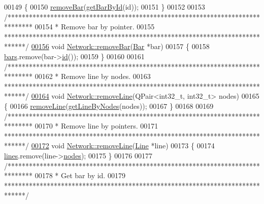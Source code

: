 \begin{DoxyCode}
00149 \{
00150   \hyperlink{group___models_ga997ce4f03d316b9f138f2e64e6ca400c}{removeBar}(\hyperlink{group___models_ga04d524ce0fa0dd0d06deda92b1597af0}{getBarById}(\textcolor{keywordtype}{id}));
00151 \}
00152 
00153 \textcolor{comment}{/*******************************************************************************}
00154 \textcolor{comment}{ * Remove bar by pointer.}
00155 \textcolor{comment}{ ******************************************************************************/}
\hypertarget{network_8cpp_source_l00156}{}\hyperlink{group___models_ga7dea7690987c58fa61ffaa0326b68b68}{00156} \textcolor{keywordtype}{void} \hyperlink{group___models_ga997ce4f03d316b9f138f2e64e6ca400c}{Network::removeBar}(\hyperlink{class_bar}{Bar} *bar)
00157 \{
00158   \hyperlink{class_network_ae37a8418e42adf765b143cdc9d992b6c}{bars}.remove(bar->\hyperlink{group___models_gacf0fb781a73856bb7beb823304465e13}{id}());
00159 \}
00160 
00161 \textcolor{comment}{/*******************************************************************************}
00162 \textcolor{comment}{ * Remove line by nodes.}
00163 \textcolor{comment}{ ******************************************************************************/}
\hypertarget{network_8cpp_source_l00164}{}\hyperlink{group___models_ga1eef3317224a7a06348fce07e581a9ad}{00164} \textcolor{keywordtype}{void} \hyperlink{group___models_ga1eef3317224a7a06348fce07e581a9ad}{Network::removeLine}(QPair<int32\_t, int32\_t> nodes)
00165 \{
00166   \hyperlink{group___models_ga1eef3317224a7a06348fce07e581a9ad}{removeLine}(\hyperlink{group___models_ga8f090b85a7779695cb9f05b6395b3044}{getLineByNodes}(nodes));
00167 \}
00168 
00169 \textcolor{comment}{/*******************************************************************************}
00170 \textcolor{comment}{ * Remove line by pointers.}
00171 \textcolor{comment}{ ******************************************************************************/}
\hypertarget{network_8cpp_source_l00172}{}\hyperlink{group___models_ga4fd51288aa75614593977ce8aab9100f}{00172} \textcolor{keywordtype}{void} \hyperlink{group___models_ga1eef3317224a7a06348fce07e581a9ad}{Network::removeLine}(\hyperlink{class_line}{Line} *line)
00173 \{
00174   \hyperlink{class_network_a49659f95d02baf087707c5a94fa23d90}{lines}.remove(line->\hyperlink{class_line_afd17c40d656e6a8d677cb22df5f0c70b}{nodes});
00175 \}
00176 
00177 \textcolor{comment}{/*******************************************************************************}
00178 \textcolor{comment}{ * Get bar by id.}
00179 \textcolor{comment}{ ******************************************************************************/}

\end{DoxyCode}
